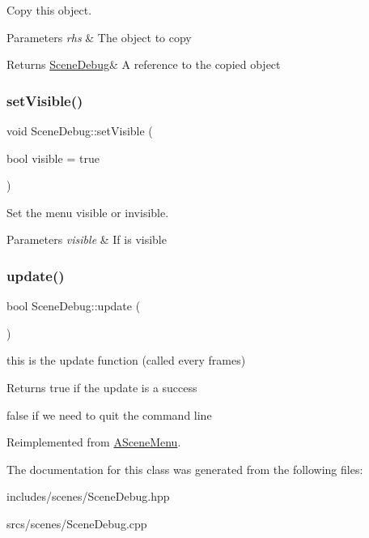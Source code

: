 Copy this object. 


\begin{DoxyParams}{Parameters}
{\em rhs} & The object to copy \\
\hline
\end{DoxyParams}
\begin{DoxyReturn}{Returns}
\hyperlink{class_scene_debug}{Scene\+Debug}\& A reference to the copied object 
\end{DoxyReturn}
\mbox{\label{class_scene_debug_a09bad98f967dad51ad4cf981010975de}} 
\subsubsection{\texorpdfstring{set\+Visible()}{setVisible()}}
{\footnotesize\ttfamily void Scene\+Debug\+::set\+Visible (\begin{DoxyParamCaption}\item[{bool}]{visible = {\ttfamily true} }\end{DoxyParamCaption})}



Set the menu visible or invisible. 


\begin{DoxyParams}{Parameters}
{\em visible} & If is visible \\
\hline
\end{DoxyParams}
\mbox{\label{class_scene_debug_a97234cec6e43aa3d891e3f6d2ff51528}} 
\subsubsection{\texorpdfstring{update()}{update()}}
{\footnotesize\ttfamily bool Scene\+Debug\+::update (\begin{DoxyParamCaption}{ }\end{DoxyParamCaption})\hspace{0.3cm}{\ttfamily [virtual]}}



this is the update function (called every frames) 

\begin{DoxyReturn}{Returns}
true if the update is a success 

false if we need to quit the command line 
\end{DoxyReturn}


Reimplemented from \hyperlink{class_a_scene_menu_a1deeb5fd9be97376998cd2af36f29744}{A\+Scene\+Menu}.



The documentation for this class was generated from the following files\+:\begin{DoxyCompactItemize}
\item 
includes/scenes/Scene\+Debug.\+hpp\item 
srcs/scenes/Scene\+Debug.\+cpp\end{DoxyCompactItemize}
